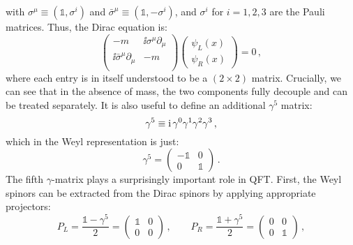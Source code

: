 \documentclass[main.tex]{subfiles}
\begin{document}
with $\sigma^\mu \equiv (\mathds{1}, \sigma^i)$ and $\bar{\sigma}^\mu \equiv (\mathds{1}, -\sigma^i)$, and $\sigma^i$ for $i=1,2,3$ are the Pauli matrices. Thus, the Dirac equation is:
\begin{equation}
    \begin{pmatrix}
        -m & \ii \sigma^\mu \partial_\mu \\
        \ii \bar{\sigma}^\mu \partial_\mu & -m \\
    \end{pmatrix}
    \begin{pmatrix}
        \psi_L(x) \\
        \psi_R(x)
    \end{pmatrix} = 0 \,,
\end{equation}
where each entry is in itself understood to be a $(2 \times 2)$ matrix. Crucially, we can see that in the absence of mass, the two components fully decouple and can be treated separately. It is also useful to define an additional $\gamma^5$ matrix: 
\begin{equation}
    \gamma^5 \equiv \mathrm{i}\, \gamma^0 \gamma^1 \gamma^2 \gamma^3\,,
\end{equation}
which in the Weyl representation is just:
\begin{equation}
    \gamma^5 = 
    \begin{pmatrix}
        -\mathds{1} & 0 \\
        0 & \mathds{1}
    \end{pmatrix}\,.
\end{equation}
The fifth $\gamma$-matrix plays a surprisingly important role in QFT. First, the Weyl spinors can be extracted from the Dirac spinors by applying appropriate projectors:
\begin{equation}
    P_L = \frac{\mathds{1}-\gamma^5}{2} = 
    \begin{pmatrix}
        \mathds{1} & 0 \\
        0 & 0
    \end{pmatrix}\,,
    \qquad
    P_R = \frac{\mathds{1}+\gamma^5}{2} = 
    \begin{pmatrix}
        0 & 0 \\
        0 & \mathds{1}
    \end{pmatrix}\,,
\end{equation}
\end{document}
